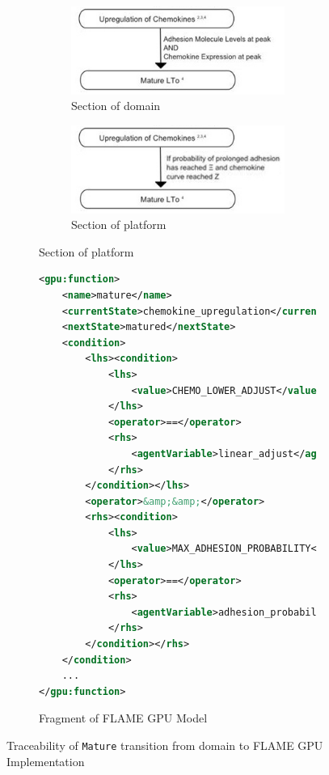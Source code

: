 \documentclass{UoYCSproject}
\begin{document}
\begin{figure}[htbp]
\begin{subfigure}{0.5\textwidth}
\begin{subfigure}{\textwidth}
\centering
\includegraphics[width=\textwidth]{Appendix/LTo_Domain_Trace}
\caption{Section of \gls{domain}}
\bigskip
\bigskip
\end{subfigure}

\begin{subfigure}{\textwidth}
\centering
\includegraphics[width=\textwidth]{Appendix/LTo_Platform_Trace}
\caption{Section of \gls{platform}}
\end{subfigure}

\end{subfigure}
\begin{subfigure}{0.5\textwidth}
\centering
\begin{lstlisting}[language=XML, basicstyle=\tiny]
<gpu:function>
    <name>mature</name>
    <currentState>chemokine_upregulation</currentState>
    <nextState>matured</nextState>
    <condition>
        <lhs><condition>
            <lhs>
                <value>CHEMO_LOWER_ADJUST</value>
            </lhs>
            <operator>==</operator>
            <rhs>
                <agentVariable>linear_adjust</agentVariable>
            </rhs>
        </condition></lhs>
        <operator>&amp;&amp;</operator>
        <rhs><condition>
            <lhs>
                <value>MAX_ADHESION_PROBABILITY</value>
            </lhs>
            <operator>==</operator>
            <rhs>
                <agentVariable>adhesion_probability</agentVariable>
            </rhs>
        </condition></rhs>
    </condition>
    ...
</gpu:function>
\end{lstlisting}
\caption{Fragment of \gls{FLAME GPU} Model}
\end{subfigure}
\caption{Traceability of \texttt{Mature} transition from \gls{domain} to \gls{FLAME GPU} Implementation}
\label{fig:traceability_condition}
\end{figure}
\end{document}
